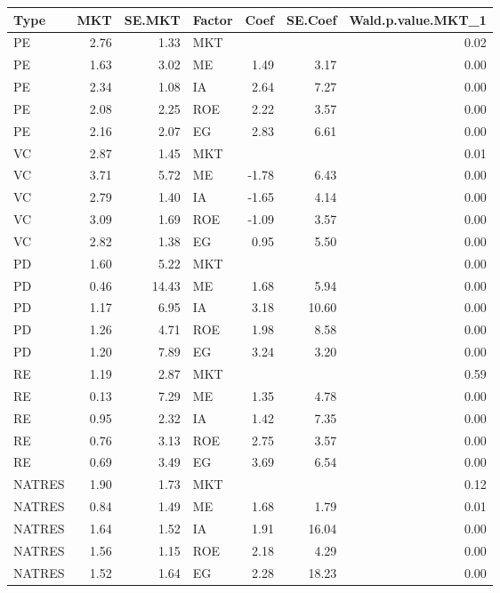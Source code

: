 \documentclass[12pt]{article}
\begin{document}
\begin{table}[ht]
	\centering
	\begin{tabular}{lrrlrrr}
		Type & MKT & SE.MKT & Factor & Coef & SE.Coef & Wald.p.value.MKT\_1 \\ 
		\hline
		\hline
		PE & 2.76 & 1.33 & MKT &  &  & 0.02 \\ 
		PE & 1.63 & 3.02 & ME & 1.49 & 3.17 & 0.00 \\ 
		PE & 2.34 & 1.08 & IA & 2.64 & 7.27 & 0.00 \\ 
		PE & 2.08 & 2.25 & ROE & 2.22 & 3.57 & 0.00 \\ 
		PE & 2.16 & 2.07 & EG & 2.83 & 6.61 & 0.00 \\
		\hline
		VC & 2.87 & 1.45 & MKT &  &  & 0.01 \\ 
		VC & 3.71 & 5.72 & ME & -1.78 & 6.43 & 0.00 \\ 
		VC & 2.79 & 1.40 & IA & -1.65 & 4.14 & 0.00 \\ 
		VC & 3.09 & 1.69 & ROE & -1.09 & 3.57 & 0.00 \\ 
		VC & 2.82 & 1.38 & EG & 0.95 & 5.50 & 0.00 \\ 
		\hline
		PD & 1.60 & 5.22 & MKT &  &  & 0.00 \\ 
		PD & 0.46 & 14.43 & ME & 1.68 & 5.94 & 0.00 \\ 
		PD & 1.17 & 6.95 & IA & 3.18 & 10.60 & 0.00 \\ 
		PD & 1.26 & 4.71 & ROE & 1.98 & 8.58 & 0.00 \\ 
		PD & 1.20 & 7.89 & EG & 3.24 & 3.20 & 0.00 \\ 
		\hline
		RE & 1.19 & 2.87 & MKT &  &  & 0.59 \\ 
		RE & 0.13 & 7.29 & ME & 1.35 & 4.78 & 0.00 \\ 
		RE & 0.95 & 2.32 & IA & 1.42 & 7.35 & 0.00 \\ 
		RE & 0.76 & 3.13 & ROE & 2.75 & 3.57 & 0.00 \\ 
		RE & 0.69 & 3.49 & EG & 3.69 & 6.54 & 0.00 \\ 
		\hline
		NATRES & 1.90 & 1.73 & MKT &  &  & 0.12 \\ 
		NATRES & 0.84 & 1.49 & ME & 1.68 & 1.79 & 0.01 \\ 
		NATRES & 1.64 & 1.52 & IA & 1.91 & 16.04 & 0.00 \\ 
		NATRES & 1.56 & 1.15 & ROE & 2.18 & 4.29 & 0.00 \\ 
		NATRES & 1.52 & 1.64 & EG & 2.28 & 18.23 & 0.00 \\ 

\end{tabular}
\end{table}
\end{document}
